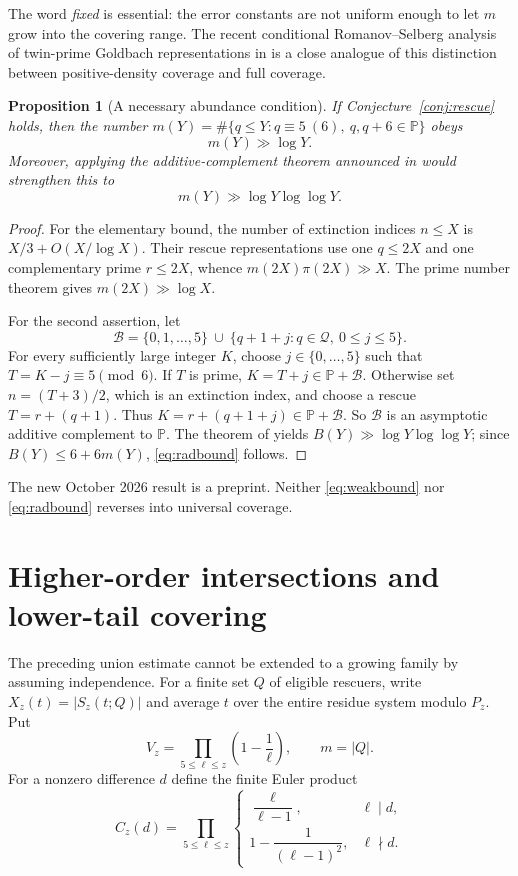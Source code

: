 \documentclass[11pt,a4paper]{article}
\newtheorem{proposition}[theorem]{Proposition}
\theoremstyle{definition}
\newcommand{\PP}{\mathbb P}
\newcommand{\Qcal}{\mathcal Q}
\begin{document}
The word \emph{fixed} is essential: the error constants are not
uniform enough to let $m$ grow into the covering range. The recent
conditional Romanov--Selberg analysis of twin-prime Goldbach
representations in \cite{Pandey2026} is a close analogue of this
distinction between positive-density coverage and full coverage.

\begin{proposition}[A necessary abundance condition]\label{prop:abundance}
If Conjecture~\ref{conj:rescue} holds, then the number
$m(Y)=\#\{q\le Y:q\equiv5\ (6),\ q,q+6\in\PP\}$ obeys
\begin{equation}\label{eq:weakbound}
 m(Y)\gg\log Y.
\end{equation}
Moreover, applying the additive-complement theorem announced in
\cite{Radomskii2026} would strengthen this to
\begin{equation}\label{eq:radbound}
 m(Y)\gg\log Y\log\log Y.
\end{equation}
\end{proposition}
\begin{proof}
For the elementary bound, the number of extinction indices
$n\le X$ is $X/3+O(X/\log X)$. Their rescue representations use
one $q\le2X$ and one complementary prime $r\le2X$, whence
$m(2X)\pi(2X)\gg X$. The prime number theorem gives
$m(2X)\gg\log X$.

For the second assertion, let
\[
 \mathcal B=\{0,1,\ldots,5\}\ \cup\
 \{q+1+j:q\in\Qcal,\ 0\le j\le5\}.
\]
For every sufficiently large integer $K$, choose
$j\in\{0,\ldots,5\}$ such that $T=K-j\equiv5\pmod6$.
If $T$ is prime, $K=T+j\in\PP+\mathcal B$. Otherwise set
$n=(T+3)/2$, which is an extinction index, and choose a rescue
$T=r+(q+1)$. Thus $K=r+(q+1+j)\in\PP+\mathcal B$.
So $\mathcal B$ is an asymptotic additive complement to $\PP$.
The theorem of \cite{Radomskii2026} yields
$B(Y)\gg\log Y\log\log Y$; since $B(Y)\le6+6m(Y)$,
\eqref{eq:radbound} follows.
\end{proof}

The new October 2026 result \cite{Radomskii2026} is a preprint.
Neither \eqref{eq:weakbound} nor \eqref{eq:radbound} reverses into
universal coverage.


\section{Higher-order intersections and lower-tail covering}

The preceding union estimate cannot be extended to a growing family by
assuming independence.  For a finite set $Q$ of eligible rescuers, write
$X_z(t)=|S_z(t;Q)|$ and average $t$ over the entire residue system
modulo $P_z$.  Put
\[
 V_z=\prod_{5\le\ell\le z}\left(1-\frac1\ell\right),\qquad m=|Q|.
\]
For a nonzero difference $d$ define the finite Euler product
\[
 C_z(d)=\prod_{5\le\ell\le z}
 \begin{cases}
 \dfrac{\ell}{\ell-1},&\ell\mid d,\\[3pt]
 1-\dfrac{1}{(\ell-1)^2},&\ell\nmid d.
 \end{cases}
\]
\end{document}
